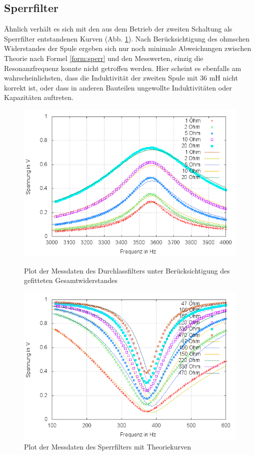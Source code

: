\subsection{Sperrfilter}
Ähnlich verhält es sich mit den aus dem Betrieb der zweiten Schaltung als Sperrfilter entstandenen Kurven (Abb. \ref{plot:sperr}). Nach Berücksichtigung des ohmschen Widerstandes der Spule ergeben sich nur noch minimale Abweichungen zwischen Theorie nach Formel \eqref{form:sperr} und den Messwerten, einzig die Resonanzfrequenz konnte nicht getroffen werden. Hier scheint es ebenfalls am wahrscheinlichsten, dass die Induktivität der zweiten Spule mit 36 mH nicht korrekt ist, oder dass in anderen Bauteilen ungewollte Induktivitäten oder Kapazitäten auftreten.
\\
\begin{figure}
	\includegraphics[width=.9\textwidth]{images/plot/durchlassfilter+theorie+R_ges-fit.png}
\caption{Plot der Messdaten des Durchlassfilters unter Berücksichtigung des gefitteten Gesamtwiderstandes}
\label{plot:durchlass+R_ges-fit}

        \includegraphics[width=.9\textwidth]{images/plot/sperrfilter+theorie+R_L.png}
\caption{Plot der Messdaten des Sperrfilters mit Theoriekurven}
\label{plot:sperr}
\end{figure}

